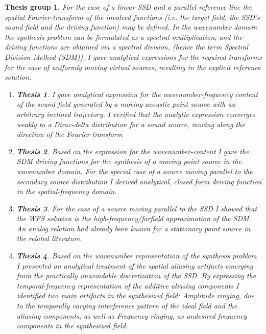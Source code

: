 \documentclass[10pt,twoside]{article}
\theoremstyle{thesisgroupstyle}
\newtheorem{thesisgroup}{Thesis group}
\newtheorem{thesis}{Thesis}[thesisgroup]
\begin{document}
\begin{thesisgroup}
For the case of a linear SSD and a parallel reference line the spatial Fourier-transform of the involved functions (i.e. the target field, the SSD's sound field and the driving function) may be defined.
In the wavenumber domain the synthesis problem can be formulated as a spectral multiplication, and the driving functions are obtained via a spectral division, (hence the term \emph{Spectral Division Method (SDM)}).
I gave analytical expressions for the required transforms for the case of uniformly moving virtual sources, resulting in the explicit reference solution.
	\begin{enumerate}
	\item[] \vspace{-7mm}\begin{thesis} I gave analytical expression for the wavenumber-frequency content of the sound field generated by a moving acoustic point source with an arbitrary inclined trajectory.
	I verified that the analytic expression converges weakly to a Dirac-delta distribution for a sound source, moving along the direction of the Fourier-transform \end{thesis}
	\item[] \vspace{-7mm}\begin{thesis} Based on the expression for the wavenumber-content I gave the SDM driving functions for the synthesis of a moving point source in the wavenumber domain.
	For the special case of a source moving parallel to the secondary source distribution I derived analytical, closed form driving function in the spatial-frequency domain.\end{thesis}
	\item[] \vspace{-7mm}\begin{thesis} For the case of a source moving parallel to the SSD I showed that the WFS solution is the high-frequency/farfield approximation of the SDM. An analog relation had already been known for a stationary point source in the related literature.\end{thesis}
	\item[] \vspace{-7mm}\begin{thesis} Based on the wavenumber representation of the synthesis problem I presented an analytical treatment of the spatial aliasing artifacts emerging from the practically unavoidable discretization of the SSD.
	By expressing the temporal-frequency representation of the additive aliasing components I identified two main artifacts in the synthesized field: \emph{Amplitude ringing}, due to the temporally varying interference pattern of the ideal field and the aliasing components, as well as \emph{Frequency ringing}, as undesired frequency components in the synthesized field.\end{thesis}

\end{enumerate}
\end{thesisgroup}
\end{document}
